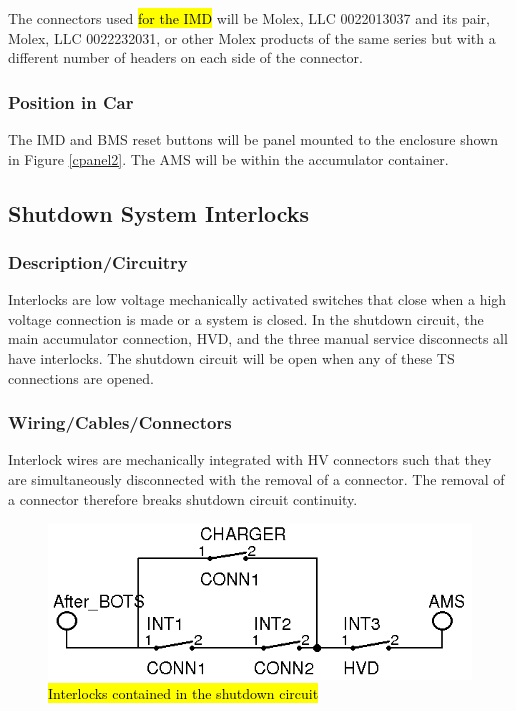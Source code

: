 \documentclass{article}
\DeclareRobustCommand{\hlr}[1]{{\sethlcolor{red}\hl{#1}}}
\begin{document}
            The connectors used \hlr{for the IMD} will be Molex, LLC 0022013037 and its pair, Molex, LLC 0022232031, or other Molex products of the same series but with a different number of headers on each side of the connector. 

        \subsubsection{Position in Car}

            The IMD and BMS reset buttons will be panel mounted to the enclosure shown in Figure \ref{cpanel2}. The AMS will be within the accumulator container.

    \subsection{Shutdown System Interlocks} \label{interlocks}
    
        \subsubsection{Description/Circuitry}

            Interlocks are low voltage mechanically activated switches that close when a high voltage connection is made or a system is closed.  In the shutdown circuit, the main accumulator connection, HVD, and the three manual service disconnects all have interlocks. The shutdown circuit will be open when any of these TS connections are opened.  

        \subsubsection{Wiring/Cables/Connectors}
        
            Interlock wires are mechanically integrated with HV connectors such that they are simultaneously disconnected with the removal of a connector. The removal of a connector therefore breaks shutdown circuit continuity. 

            \begin{figure}[H]
                \centering
                \includegraphics{interlocks}
                \caption{\hlr{Interlocks contained in the shutdown circuit}}
                \label{interlockschem}
            \end{figure}
\end{document}
